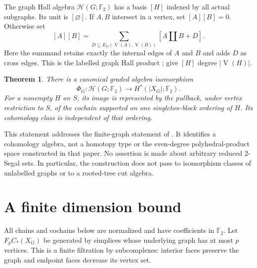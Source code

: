 \documentclass[11pt,a4paper]{article}
\newtheorem{theorem}{Theorem}
\newcommand{\F}{\mathbb F_2}
\newcommand{\HH}{\mathcal H}
\newcommand{\verts}{\operatorname{V}}
\begin{document}
The graph Hall algebra $\HH(G;\F)$ has a basis $[H]$ indexed by all actual
subgraphs. Its unit is $[\varnothing]$. If $A,B$ intersect in a vertex, set
$[A][B]=0$. Otherwise set
\begin{equation}\label{hallproduct}
 [A][B]=\sum_{D\subseteq E_G(\verts(A),\verts(B))}[A\amalg B+D].
\end{equation}
Here the summand retains exactly the internal edges of $A$ and $B$ and adds
$D$ as cross edges. This is the labelled graph Hall product
\cite[Proposition 4.4.1]{toury}; give $[H]$ degree $|\verts(H)|$.

\begin{theorem}\label{main}
There is a canonical graded algebra isomorphism
\[
 \Phi_G:\HH(G;\F)\longrightarrow H^*(|X_G|;\F).
\]
For a nonempty $H$ on $S$, its image is represented by the pullback, under
vertex restriction to $S$, of the cochain supported on one singleton-block
ordering of $H$. Its cohomology class is independent of that ordering.
\end{theorem}

This statement addresses the finite-graph statement of \cite[Conjecture 1.1]{toury}.
It identifies a cohomology algebra, not a homotopy type or the even-degree
polyhedral-product space constructed in that paper. No assertion is made about
arbitrary reduced 2-Segal sets. In particular, the construction does not pass
to isomorphism classes of unlabelled graphs or to a rooted-tree cut algebra.

\section{A finite dimension bound}
All chains and cochains below are normalized and have coefficients in $\F$.
Let $F_p C_*(X_G)$ be generated by simplices whose underlying graph has at
most $p$ vertices. This is a finite filtration by subcomplexes: interior faces
preserve the graph and endpoint faces decrease its vertex set.
\end{document}
